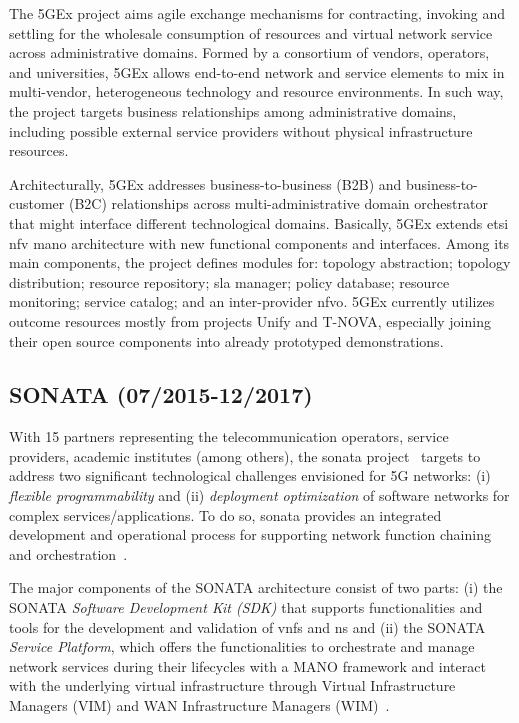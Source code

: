 The 5GEx project aims agile exchange mechanisms for contracting, invoking and settling for the wholesale consumption of resources and virtual network service across administrative domains. 
Formed by a consortium of vendors, operators, and universities, 5GEx allows end-to-end network and service elements to mix in multi-vendor, heterogeneous technology and resource environments.
In such way, the project targets business relationships among administrative domains, including possible external service providers without physical infrastructure resources.

Architecturally, 5GEx addresses business-to-business (B2B) and business-to-customer (B2C) relationships across multi-administrative domain orchestrator that might interface different technological domains. 
Basically, 5GEx extends \gls{etsi} \gls{nfv} \gls{mano} architecture with new functional components and interfaces.
Among its main components, the project defines modules for: topology abstraction; topology distribution; resource repository; \gls{sla} manager; policy database; resource monitoring; service catalog; and an inter-provider \gls{nfvo}.
5GEx currently utilizes outcome resources mostly from projects Unify and T-NOVA, especially joining their open source components into already prototyped demonstrations. 

\subsection{SONATA (07/2015-12/2017)}

With 15 partners representing the telecommunication operators, service providers, academic institutes (among others), the \acrfull{sonata} project~\cite{sonata} targets to address two significant technological challenges envisioned for 5G networks: (i) \textit{flexible programmability} and (ii) \textit{deployment optimization} of software networks for complex services/applications. To do so, \acrshort{sonata} provides an integrated development and operational process for supporting network function chaining and orchestration~\cite{karl2016devops}. 

The major components of the SONATA architecture consist of two parts: (i) the SONATA \textit{Software Development Kit (SDK)} that supports functionalities and tools for the development and validation of \glspl{vnf} and \gls{ns} and (ii) the SONATA \textit{Service Platform}, which offers the functionalities to orchestrate and manage network services during their lifecycles with a MANO framework and interact with the underlying virtual infrastructure through Virtual Infrastructure Managers (VIM) and WAN Infrastructure Managers (WIM)~\cite{Draxler2017SONATA:Networksb}.

